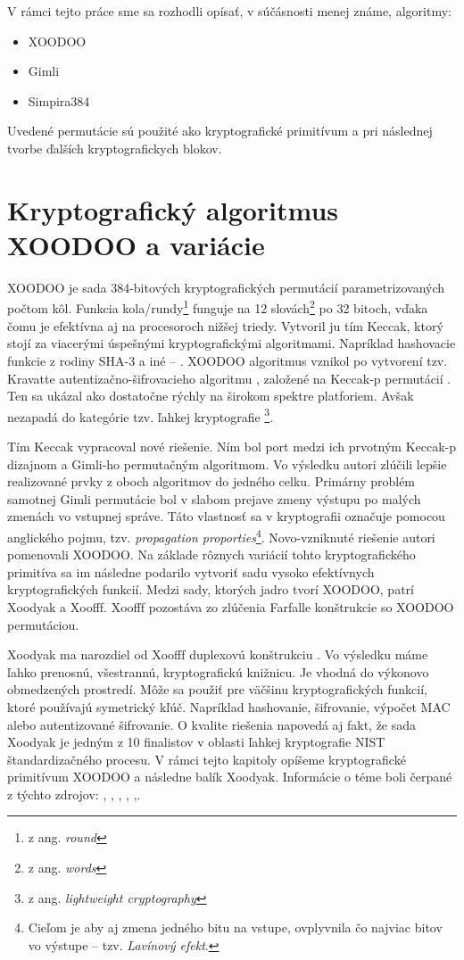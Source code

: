 V rámci tejto práce sme sa rozhodli opísať, v súčásnosti menej známe, algoritmy: 
\begin{itemize}
	\item XOODOO \cite{tkecak}
	\item Gimli \cite{gimli}
	\item Simpira384 \cite{simpira}
\end{itemize}  
Uvedené permutácie sú použité ako kryptografické primitívum a pri následnej tvorbe ďalších kryptografickych blokov. 

\section{Kryptografický algoritmus XOODOO a variácie} 
XOODOO je sada 384-bitových kryptografických permutácií parametrizovaných počtom kôl. Funkcia kola/rundy\footnote{z ang. \textit{round}} funguje na 12 slovách\footnote{z ang. \textit{words}} po 32 bitoch, vďaka čomu je efektívna aj na procesoroch nižšej triedy. Vytvoril ju tím Keccak, ktorý stojí za viacerými úspešnými kryptografickými algoritmami. Napríklad hashovacie funkcie z rodiny SHA-3 a iné -- \cite{kecsup}. XOODOO algoritmus vznikol po vytvorení tzv. Kravatte autentizačno-šifrovacieho algoritmu \cite{kravatte}, založené na Keccak-p permutácií \cite{keccakp}. Ten sa ukázal ako dostatočne rýchly na širokom spektre platforiem. Avšak nezapadá do kategórie tzv. ľahkej kryptografie \footnote{z ang. \textit{lightweight cryptography}}.

Tím Keccak vypracoval nové riešenie. Ním bol port medzi ich prvotným Keccak-p dizajnom a Gimli-ho \cite{bernstein2017gimli} permutačným algoritmom. Vo výsledku autori zlúčili lepšie realizované prvky z oboch algoritmov do jedného celku. Primárny problém samotnej Gimli permutácie bol v slabom prejave zmeny výstupu po malých zmenách vo vstupnej správe. Táto vlastnosť sa v kryptografii označuje pomocou anglického pojmu, tzv. \textit{propagation proporties}\footnote{Cieľom je aby aj zmena jedného bitu na vstupe, ovplyvnila čo najviac bitov vo výstupe -- tzv. \textit{Lavínový efekt}.}. Novo-vzniknuté riešenie autori pomenovali XOODOO. Na základe rôznych variácií tohto kryptografického primitíva sa im následne podarilo vytvoriť sadu vysoko efektívnych kryptografických funkcií. 
Medzi sady, ktorých jadro tvorí XOODOO, patrí Xoodyak a Xoofff. Xoofff pozostáva zo zlúčenia Farfalle konštrukcie \cite{farfalle} so XOODOO permutáciou. 

Xoodyak ma narozdiel od Xoofff duplexovú konštrukciu \cite{duplex}. Vo výsledku máme ľahko prenosnú, všestrannú, kryptografickú knižnicu. Je vhodná do výkonovo obmedzených prostredí. Môže sa použiť pre väčšinu kryptografických funkcií, ktoré používajú symetrický kľúč. Napríklad hashovanie, šifrovanie, výpočet MAC alebo autentizované šifrovanie. O kvalite riešenia napovedá aj fakt, že sada Xoodyak je jedným z 10 finalistov v oblasti ľahkej kryptografie NIST štandardizačného procesu.
V rámci tejto kapitoly opíšeme kryptografické primitívum XOODOO a následne balík Xoodyak. Informácie o téme boli čerpané z týchto zdrojov: \cite{tkecak}, \cite{xd}, \cite{xcb}, \cite{xoodoocb}, \cite{xdupdate},\cite{xdr1}.
